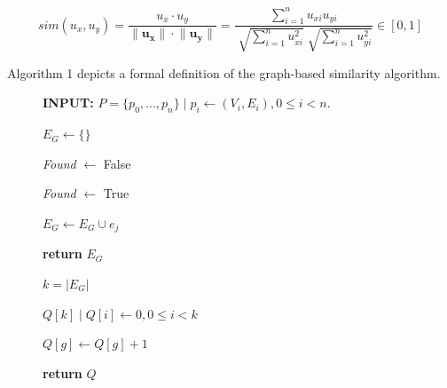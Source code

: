 \[sim(u_x,u_y) =  \dfrac{u_x \cdot  u_y}{ \lVert \mathbf{u_x} \rVert \cdot \lVert \mathbf{u_y} \rVert} =\dfrac{\sum_{i=1}^n u_{xi} u_{yi} }{\sqrt[]{\sum_{i=1}^n u_{xi}^2} \sqrt[]{\sum_{i=1}^n u_{yi}^2}}  \in [0,1] \]


Algorithm 1 depicts a formal definition of the graph-based similarity algorithm.




\begin{figure}[h!]

\begin{algorithmic}[1]

\State \textbf{INPUT: } $P=\{p_0,...,p_n\} \mid p_i\gets (V_i, E_i), 0 \leq i < n.$

\State $E_G \gets \{\}$


\State \textit{Found} $\gets$ False

\State \textit{Found} $\gets$ True
\EndIf
\EndFor



\State $E_G \gets E_G \cup e_j$
\EndIf

\EndFor

\EndFor
\State \textbf{return} $E_G$

\EndProcedure



\end{algorithmic}


\begin{algorithmic}[1]


\State $k = |E_G|$

\State $Q[k] \mid Q[i] \gets 0, 0 \leq i < k$




\State $Q[g] \gets Q[g] + 1$
\EndIf

\EndFor

\EndFor


\State \textbf{return} $Q$

\EndProcedure

\end{algorithmic}



\end{figure}
